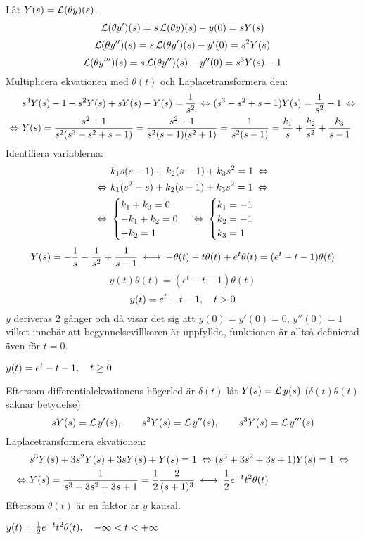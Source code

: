 \pagebreak
\begin{task}{5.9}
	Låt $Y(s)=\operatorname{\mathcal{L}}(\theta y)(s)$.
	\[\operatorname{\mathcal{L}}(\theta y')(s)=s\operatorname{\mathcal{L}}(\theta y)(s)-y(0)=sY(s)\]
	\[\operatorname{\mathcal{L}}(\theta y'')(s)=s\operatorname{\mathcal{L}}(\theta y')(s)-y'(0)=s^2Y(s)\]
	\[\operatorname{\mathcal{L}}(\theta y''')(s)=s\operatorname{\mathcal{L}}(\theta y'')(s)-y''(0)=s^3Y(s)-1\]
	Multiplicera ekvationen med $\theta(t)$ och Laplacetransformera den:
	\begin{align*}
	&s^3Y(s)-1-s^2Y(s)+sY(s)-Y(s)=\frac{1}{s^2} \lra
	(s^3-s^2+s-1)Y(s)=\frac{1}{s^2}+1 \lra \\ \lra
	&Y(s)=\frac{s^2+1}{s^2(s^3-s^2+s-1)}=
	\frac{s^2+1}{s^2(s-1)(s^2+1)}=
	\frac{1}{s^2(s-1)}=
	\frac{k_1}{s}+\frac{k_2}{s^2}+\frac{k_3}{s-1}
	\end{align*}
	Identifiera variablerna:
	\begin{align*}
	&k_1s(s-1)+k_2(s-1)+k_3s^2=1 \lra \\ \lra
	&k_1(s^2-s)+k_2(s-1)+k_3s^2=1 \lra \\ \lra
	&\begin{cases}
	k_1+k_3=0 \\
	-k_1+k_2=0 \\
	-k_2=1
	\end{cases} \lra
	\begin{cases}
	k_1=-1 \\
	k_2=-1 \\
	k_3=1
	\end{cases}
	\end{align*}
	\begin{align*}
	Y(s)=-\frac{1}{s}-\frac{1}{s^2}+\frac{1}{s-1} \llra
	-\theta(t)-t\theta(t)+e^{t}\theta(t)=
	(e^{t}-t-1)\theta(t)
	\end{align*}
	\[y(t)\theta(t)=(e^{t}-t-1)\theta(t)\]
	\[y(t)=e^{t}-t-1, \quad t>0\]
	$y$ deriveras 2 gånger och då visar det sig att $y(0)=y'(0)=0$, $y''(0)=1$ vilket innebär att begynnelsevillkoren är uppfyllda, funktionen är alltså definierad även för $t=0$.
	
	\ans $y(t)=e^{t}-t-1, \quad t\ge0$
\end{task}

\begin{task}{5.10}
	Eftersom differentialekvationens högerled är $\delta(t)$ låt $Y(s)=\operatorname{\mathcal{L}} y(s)$ ($\delta(t)\theta(t)$ saknar betydelse)
	\[sY(s)=\operatorname{\mathcal{L}} y'(s),\qquad s^2Y(s)=\operatorname{\mathcal{L}} y''(s),\qquad s^3Y(s)=\operatorname{\mathcal{L}} y'''(s)\]
	Laplacetransformera ekvationen:
	\begin{align*}
	&s^3Y(s)+3s^2Y(s)+3sY(s)+Y(s)=1 \lra
	(s^3+3s^2+3s+1)Y(s)=1\lra \\ \lra
	&Y(s)=\frac{1}{s^3+3s^2+3s+1}=
	\frac{1}{2}\frac{2}{(s+1)^3}\llra
	\frac{1}{2}e^{-t}t^2\theta(t)
	\end{align*}
	Eftersom $\theta(t)$ är en faktor är $y$ kausal.
	
	\ans $y(t)=\frac{1}{2}e^{-t}t^2\theta(t), \quad -\infty<t<+\infty$
\end{task}

